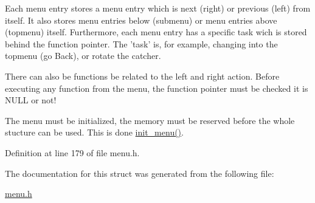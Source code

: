 Each menu entry stores a menu entry which is next (right) or previous (left) from itself. It also stores menu entries below (submenu) or menu entries above (topmenu) itself. Furthermore, each menu entry has a specific task wich is stored behind the function pointer. The 'task' is, for example, changing into the topmenu (go Back), or rotate the catcher.

There can also be functions be related to the left and right action. Before executing any function from the menu, the function pointer must be checked it is NULL or not!

The menu must be initialized, the memory must be reserved before the whole stucture can be used. This is done \hyperlink{inits_8c_5cf20cf8f8b8d7c2aeaaea014d157583}{init\_\-menu()}. 

Definition at line 179 of file menu.h.

The documentation for this struct was generated from the following file:\begin{CompactItemize}
\item 
\hyperlink{menu_8h}{menu.h}\end{CompactItemize}
